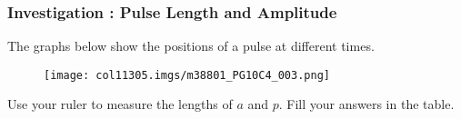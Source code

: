             \subsubsection{  Investigation : Pulse Length and Amplitude }
            \nopagebreak
        \label{m38801*id312993}The graphs below show the positions of a pulse at different times.\par 
        \label{m38801*id312998}
    \setcounter{subfigure}{0}
	\begin{figure}[H] %
    \begin{center}
    \label{m38801*id313002!!!underscore!!!media}\label{m38801*id313002!!!underscore!!!printimage}\texttt{[image: col11305.imgs/m38801\_PG10C4\_003.png]} %
      \vspace{2pt}
    \vspace{.1in}
    \end{center}
 \end{figure}       
        \par 
        \label{m38801*id313008}Use your ruler to measure the lengths of $a$ and $p$. Fill your answers in the table.\par 
